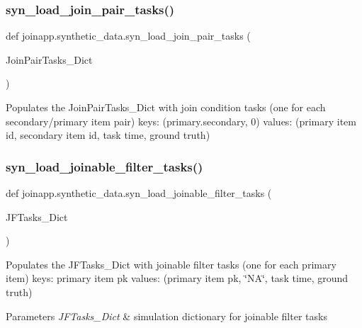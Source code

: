 \subsubsection{\texorpdfstring{syn\_load\_join\_pair\_tasks()}{syn\_load\_join\_pair\_tasks()}}
{\footnotesize\ttfamily def joinapp.\+synthetic\+\_\+data.\+syn\+\_\+load\+\_\+join\+\_\+pair\+\_\+tasks (\begin{DoxyParamCaption}\item[{}]{Join\+Pair\+Tasks\+\_\+\+Dict }\end{DoxyParamCaption})}

\begin{DoxyVerb}Populates the JoinPairTasks_Dict with join condition tasks (one for each secondary/primary item pair)
keys: (primary.secondary, 0)
values: (primary item id, secondary item id, task time, ground truth)
\end{DoxyVerb}
 \mbox{\label{namespacejoinapp_1_1synthetic__data_abc7c245396b8cec18cd7217cfc3d9be7}} 
\subsubsection{\texorpdfstring{syn\_load\_joinable\_filter\_tasks()}{syn\_load\_joinable\_filter\_tasks()}}
{\footnotesize\ttfamily def joinapp.\+synthetic\+\_\+data.\+syn\+\_\+load\+\_\+joinable\+\_\+filter\+\_\+tasks (\begin{DoxyParamCaption}\item[{}]{J\+F\+Tasks\+\_\+\+Dict }\end{DoxyParamCaption})}



Populates the J\+F\+Tasks\+\_\+\+Dict with joinable filter tasks (one for each primary item) keys\+: primary item pk values\+: (primary item pk, \char`\"{}\+N\+A\char`\"{}, task time, ground truth) 


\begin{DoxyParams}{Parameters}
{\em J\+F\+Tasks\+\_\+\+Dict} & simulation dictionary for joinable filter tasks \\
\hline
\end{DoxyParams}
\mbox{\label{namespacejoinapp_1_1synthetic__data_a0d5f2eaec09d1edc8531ab9f8c85f7f0}} 
